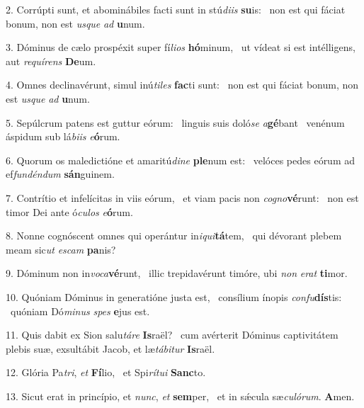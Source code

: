 2. Corrúpti sunt, et abominábiles facti sunt in stú\textit{di}\textit{is} \textbf{su}is: \ast\  non est qui fáciat bonum, non est \textit{us}\textit{que} \textit{ad} \textbf{u}num.\

3. Dóminus de cælo prospéxit super fí\textit{li}\textit{os} \textbf{hó}minum, \ast\  ut vídeat si est intélligens, aut \textit{re}\textit{quí}\textit{rens} \textbf{De}um.\

4. Omnes declinavérunt, simul inú\textit{ti}\textit{les} \textbf{fac}ti sunt: \ast\  non est qui fáciat bonum, non est \textit{us}\textit{que} \textit{ad} \textbf{u}num.\

5. Sepúlcrum patens est guttur eórum: \dag\  linguis suis doló\textit{se} \textit{a}\textbf{gé}bant \ast\  venénum áspidum sub lá\textit{bi}\textit{is} \textit{e}\textbf{ó}rum.\

6. Quorum os maledictióne et amaritú\textit{di}\textit{ne} \textbf{ple}num est: \ast\  velóces pedes eórum ad ef\textit{fun}\textit{dén}\textit{dum} \textbf{sán}guinem.\

7. Contrítio et infelícitas in viis eórum, \dag\  et viam pacis non \textit{co}\textit{gno}\textbf{vé}runt: \ast\  non est timor Dei ante ó\textit{cu}\textit{los} \textit{e}\textbf{ó}rum.\

8. Nonne cognóscent omnes qui operántur in\textit{i}\textit{qui}\textbf{tá}tem, \ast\  qui dévorant plebem meam sic\textit{ut} \textit{es}\textit{cam} \textbf{pa}nis?\

9. Dóminum non in\textit{vo}\textit{ca}\textbf{vé}runt, \ast\  illic trepidavérunt timóre, ubi \textit{non} \textit{e}\textit{rat} \textbf{ti}mor.\

10. Quóniam Dóminus in generatióne justa est, \dag\  consílium ínopis \textit{con}\textit{fu}\textbf{dís}tis: \ast\  quóniam Dó\textit{mi}\textit{nus} \textit{spes} \textbf{e}jus est.\

11. Quis dabit ex Sion salu\textit{tá}\textit{re} \textbf{Is}raël? \ast\  cum avérterit Dóminus captivitátem plebis suæ, exsultábit Jacob, et læ\textit{tá}\textit{bi}\textit{tur} \textbf{Is}raël.\

12. Glória Pa\textit{tri}, \textit{et} \textbf{Fí}lio, \ast\  et Spi\textit{rí}\textit{tu}\textit{i} \textbf{Sanc}to.\

13. Sicut erat in princípio, et \textit{nunc}, \textit{et} \textbf{sem}per, \ast\  et in sǽcula sæ\textit{cu}\textit{ló}\textit{rum}. \textbf{A}men.\

